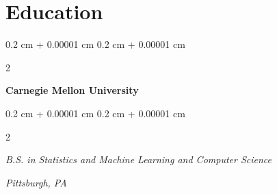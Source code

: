 \documentclass[10pt, letterpaper]{article}
\newenvironment{highlightsforbulletentries}{
    \begin{itemize}[
        topsep=0.10 cm,
        parsep=0.10 cm,
        partopsep=0pt,
        itemsep=0pt,
        leftmargin=10pt
    ]
}{
    \end{itemize}
} %
\newenvironment{onecolentry}{
    \begin{adjustwidth}{
        0.2 cm + 0.00001 cm
    }{
        0.2 cm + 0.00001 cm
    }
}{
    \end{adjustwidth}
} %
\newenvironment{twocolentry}[2][]{
    \onecolentry
    \def\secondColumn{#2}
    \setcolumnwidth{\fill, 4.5 cm}
    \begin{paracol}{2}
}{
    \switchcolumn \raggedleft \secondColumn
    \end{paracol}
    \endonecolentry
} %
\let\hrefWithoutArrow\href
\renewcommand{\href}[2]{\hrefWithoutArrow{#1}{\ifthenelse{\equal{#2}{}}{ }{#2 }\raisebox{.15ex}{\footnotesize \faExternalLink*}}}
\begin{document}

    








    \section{Education}

        \begin{twocolentry}{
        }
            \textbf{Carnegie Mellon University}
        \end{twocolentry}
        \begin{twocolentry}{
            \textit{Pittsburgh, PA}}
            \textit{B.S. in Statistics and Machine Learning and Computer Science}
        \end{twocolentry}
        
\end{document}
